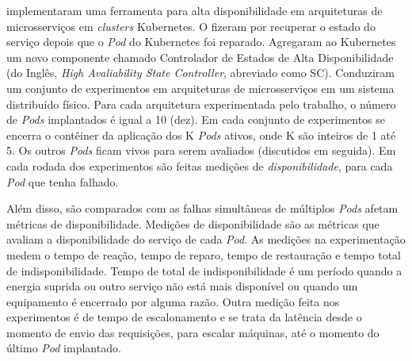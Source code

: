 
\textcite{vayghan2021kubernetes}
implementaram uma ferramenta
para alta disponibilidade 
em arquiteturas de microsserviços em \textit{clusters} Kubernetes. O fizeram por recuperar o estado do serviço depois que o \textit{Pod} do Kubernetes foi reparado. Agregaram ao Kubernetes um novo componente chamado Controlador de Estados de Alta Disponibilidade (do Inglês, \textit{High Avaliability State Controller}, abreviado como SC).
Conduziram um conjunto de experimentos em arquiteturas de microsserviços em um sistema distribuído físico.
Para cada arquitetura experimentada pelo trabalho, o número de \textit{Pods} implantados é igual a 10 (dez). Em cada conjunto de experimentos se encerra o contêiner da aplicação dos K \textit{Pods} ativos, onde K são inteiros de 1 até 5. Os outros \textit{Pods} ficam vivos para serem avaliados (discutidos em seguida). Em cada rodada dos experimentos são feitas medições de \textit{disponibilidade}, para cada \textit{Pod} que tenha falhado.

Além disso, são comparados com as falhas simultâneas de múltiplos \textit{Pods} afetam métricas de disponibilidade. Medições de disponibilidade são as métricas que avaliam a disponibilidade do serviço de cada \textit{Pod}. As medições na experimentação medem o tempo de reação, tempo de reparo, tempo de restauração e tempo total de indisponibilidade. Tempo de total de indisponibilidade é um período quando a energia suprida ou outro serviço não está mais disponível ou quando um equipamento é encerrado por alguma razão. Outra medição feita nos experimentos é de tempo de escalonamento e se trata da latência desde o momento de envio das requisições, para escalar máquinas, até o momento do último \textit{Pod} implantado.

